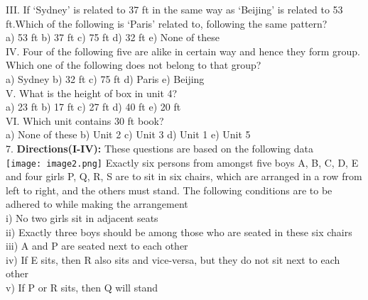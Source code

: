 \documentclass[
]{article}
\begin{document}
III. If ‘Sydney’ is related to 37 ft in the same way as ‘Beijing’ is related to 53 ft.Which of the
following is ‘Paris’ related to, following the same pattern?\\
a) 53 ft \hspace{2mm}b) 37 ft \hspace{2mm}c) 75 ft \hspace{2mm}d) 32 ft \hspace{2mm}e) None of these\\

IV. Four of the following five are alike in certain way and hence they form group. Which
one of the following does not belong to that group?\\
a) Sydney \hspace{2mm}b) 32 ft \hspace{2mm}c) 75 ft \hspace{2mm}d) Paris \hspace{2mm}e) Beijing\\

V. What is the height of box in unit 4?\\
a) 23 ft \hspace{2mm}b) 17 ft \hspace{2mm}c) 27 ft \hspace{2mm}d) 40 ft \hspace{2mm}e) 20 ft\\

VI. Which unit contains 30 ft book?\\
a) None of these \hspace{2mm}b) Unit 2 \hspace{2mm}c) Unit 3 \hspace{2mm}d) Unit 1 \hspace{2mm}e) Unit 5\\

7. \textbf{Directions(I-IV):} These questions are based on the following data\\
\texttt{[image: image2.png]}
Exactly six persons from amongst five boys A, B, C, D, E and four girls P, Q, R, S are to sit in
six chairs, which are arranged in a row from left to right, and the others must stand. The
following conditions are to be adhered to while making the arrangement\\
i) No two girls sit in adjacent seats\\
ii) Exactly three boys should be among those who are seated in these six chairs\\
iii) A and P are seated next to each other\\
iv) If E sits, then R also sits and vice-versa, but they do not sit next to each other\\
v) If P or R sits, then Q will stand\\
\end{document}
